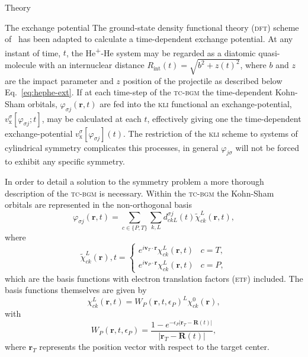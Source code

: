 \documentclass[aps, pra, reprint, groupedaddress, amsfonts,
               amsmath, amssymb, showpacs, nofootinbib]{revtex4-1}
\begin{document}
\begin{section}{Theory \label{sec:theory}}
\begin{subsection}{The exchange potential \label{sec:xpot}}
      The ground-state density functional theory (\textsc{dft}) scheme of~\cite{diamol} has been adapted
      to calculate a time-dependent exchange potential. At any instant of time, $t$, the
      He\textsuperscript{+}-He system may be regarded as a diatomic quasi-molecule with an internuclear
      distance $R_\mathrm{int}(t) = \sqrt{b^2 + z(t)^2}$, where $b$ and $z$ are the impact parameter and
      $z$ position of the projectile as described below Eq.~\eqref{eq:hephe-ext}. If at each time-step
      of the \textsc{tc-bgm} the time-dependent Kohn-Sham orbitals, $\varphi_{\sigma j}(\mathbf{r},t)$
      are fed into the \textsc{kli} functional an exchange-potential,
      $v^{\sigma}_\mathrm{x}[\varphi_{\sigma j};t]$, may be calculated at each $t$, effectively
      giving one the time-dependent exchange-potential $v^{\sigma}_\mathrm{x}[\varphi_{\sigma j}](t)$.
      The restriction of the \textsc{kli} scheme to systems of cylindrical symmetry complicates this
      processes, in general $\varphi_{j \sigma}$ will not be forced to exhibit any specific symmetry.
      
      In order to detail a solution to the symmetry problem a more thorough description of the
      \textsc{tc-bgm} is necessary. Within the \textsc{tc-bgm} the Kohn-Sham orbitals are represented in
      the non-orthogonal basis
      \begin{equation} \label{eq:bgmexp}
         \varphi_{\sigma j}(\mathbf{r},t) = \sum\limits_{c \in \{P, T\}} \sum\limits_{k, L}
                               d_{c k L}^{\sigma j}(t) \tilde{\chi}^{L}_{c k}(\mathbf{r},t),
      \end{equation}
      where
      \begin{equation} \label{eq:etfbasis}
         \tilde{\chi}^{L}_{ck}(\mathbf{r}),t =
            \begin{cases}
               e^{i \mathbf{v}_T \cdot \mathbf{r}} {\chi}^{L}_{c k}(\mathbf{r},t) & c = T, \\[2ex]
               e^{i \mathbf{v}_P \cdot \mathbf{r}} {\chi}^{L}_{c k}(\mathbf{r},t) & c = P,
            \end{cases}
      \end{equation}
      which are the basis functions with electron translation factors (\textsc{etf}) included. The basis
      functions themselves are given by
      \begin{equation} \label{eq:bgmbasis}
         \chi^{L}_{ck} (\mathbf{r},t)
         = W_P( \mathbf{r},t, \epsilon_P)^L \chi^{0}_{ck} (\mathbf{r}),
      \end{equation}
      with
      \begin{equation}
         W_P (\mathbf{r},t,\epsilon_P)
         = \frac{1 - e^{-\epsilon_P|\mathbf{r}_T - \mathbf{R}(t)|}}{|\mathbf{r}_T - \mathbf{R}(t)|},
      \end{equation}
      where $\mathbf{r}_T$ represents the position vector with respect to the target center.
      

\end{subsection}
\end{section}
\end{document}
